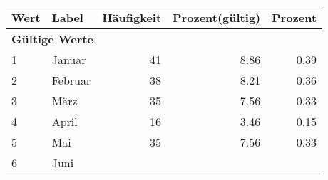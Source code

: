      \begin{longtable}{lXrrr}
     \toprule
     \textbf{Wert} & \textbf{Label} & \textbf{Häufigkeit} & \textbf{Prozent(gültig)} & \textbf{Prozent} \\
     \endhead
     \midrule
     \multicolumn{5}{l}{\textbf{Gültige Werte}}\\

     1 &
     \multicolumn{1}{X}{ Januar   } &


       \num{41} &
       \num[round-mode=places,round-precision=2]{8.86} &
         \num[round-mode=places,round-precision=2]{0.39} \\

     2 &
     \multicolumn{1}{X}{ Februar   } &


       \num{38} &
       \num[round-mode=places,round-precision=2]{8.21} &
         \num[round-mode=places,round-precision=2]{0.36} \\

     3 &
     \multicolumn{1}{X}{ März   } &


       \num{35} &
       \num[round-mode=places,round-precision=2]{7.56} &
         \num[round-mode=places,round-precision=2]{0.33} \\

     4 &
     \multicolumn{1}{X}{ April   } &


       \num{16} &
       \num[round-mode=places,round-precision=2]{3.46} &
         \num[round-mode=places,round-precision=2]{0.15} \\

     5 &
     \multicolumn{1}{X}{ Mai   } &


       \num{35} &
       \num[round-mode=places,round-precision=2]{7.56} &
         \num[round-mode=places,round-precision=2]{0.33} \\

     6 &
     \multicolumn{1}{X}{ Juni   } &



\end{longtable}
